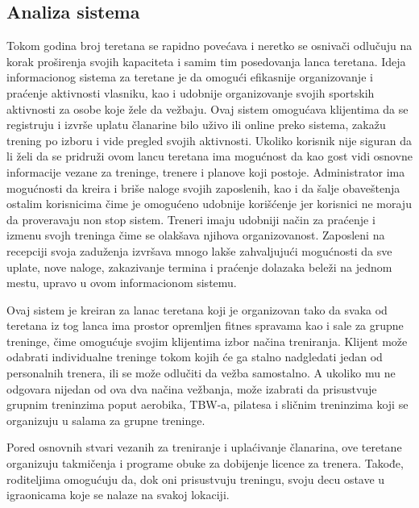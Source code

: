 \documentclass[../main.tex]{subfiles}
\begin{document}
\subsection{Analiza sistema}

Tokom godina broj teretana se rapidno povećava i neretko se osnivači odlučuju na korak proširenja svojih kapaciteta i samim tim posedovanja lanca teretana. Ideja informacionog sistema za teretane je da omogući efikasnije organizovanje i praćenje aktivnosti vlasniku, kao i udobnije organizovanje svojih sportskih aktivnosti za osobe koje žele da vežbaju. Ovaj sistem omogućava klijentima da se registruju i izvrše uplatu članarine bilo uživo ili online preko sistema, zakažu trening po izboru i vide pregled svojih aktivnosti. Ukoliko korisnik nije siguran da li želi da se pridruži ovom lancu teretana ima mogućnost da kao gost vidi osnovne informacije vezane za treninge, trenere i planove koji postoje. Administrator ima mogućnosti da kreira i briše naloge svojih zaposlenih, kao i da šalje obaveštenja ostalim korisnicima čime je omogućeno udobnije korišćenje jer korisnici ne moraju da proveravaju non stop sistem. Treneri imaju udobniji način za praćenje i izmenu svojh treninga čime se olakšava njihova organizovanost. Zaposleni na recepciji svoja zaduženja izvršava mnogo lakše zahvaljujući mogućnosti da sve uplate, nove naloge, zakazivanje termina i praćenje dolazaka beleži na jednom mestu, upravo u ovom informacionom sistemu.

Ovaj sistem je kreiran za lanac teretana koji je organizovan tako da svaka od teretana iz tog lanca ima prostor opremljen fitnes spravama kao i sale za grupne treninge, čime omogućuje svojim klijentima izbor načina treniranja. Klijent može odabrati individualne treninge tokom kojih će ga stalno nadgledati jedan od personalnih trenera, ili se može odlučiti da vežba samostalno. A ukoliko mu ne odgovara nijedan od ova dva načina vežbanja, može izabrati da prisustvuje grupnim treninzima poput aerobika, TBW-a, pilatesa i sličnim treninzima koji se organizuju u salama za grupne treninge. 

Pored osnovnih stvari vezanih za treniranje i uplaćivanje članarina, ove teretane organizuju takmičenja i programe obuke za dobijenje licence za trenera. Takođe, roditeljima omogućuju da, dok oni prisustvuju treningu, svoju decu ostave u igraonicama koje se nalaze na svakoj lokaciji.
\end{document}
